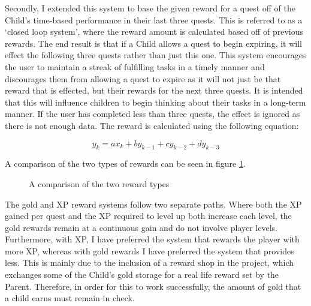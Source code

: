 Secondly, I extended this system to base the given reward for a quest off of the Child's time-based performance in their last three quests.
This is referred to as a `closed loop system', where the reward amount is calculated based off of previous rewards.
The end result is that if a Child allows a quest to begin expiring, it will effect the following three quests rather than just this one.
This system encourages the user to maintain a streak of fulfilling tasks in a timely manner and discourages them from allowing a quest to expire as it will not just be that reward that is effected, but their rewards for the next three quests.
It is intended that this will influence children to begin thinking about their tasks in a long-term manner.
If the user has completed less than three quests, the effect is ignored as there is not enough data.
The reward is calculated using the following equation:

\begin{equation} \label{eq:closedloopreward}
	y_k = ax_k + by_{k-1} + cy_{k-2} + dy_{k-3}
\end{equation}

A comparison of the two types of rewards can be seen in figure \ref{fig:rewardcomparison}.

\begin{figure}[ht]
\centering
{}
\caption{A comparison of the two reward types}
\label{fig:rewardcomparison}
\end{figure}

The gold and XP reward systems follow two separate paths.
Where both the XP gained per quest and the XP required to level up both increase each level, the gold rewards remain at a continuous gain and do not involve player levels.
Furthermore, with XP, I have preferred the system that rewards the player with more XP, whereas with gold rewards I have preferred the system that provides less.
This is mainly due to the inclusion of a reward shop in the project, which exchanges some of the Child's gold storage for a real life reward set by the Parent. 
Therefore, in order for this to work successfully, the amount of gold that a child earns must remain in check.


